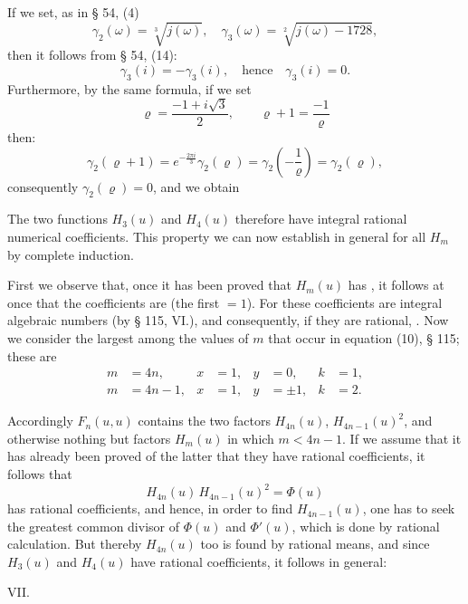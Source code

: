 If we set, as in § 54, (4)
\[
\gamma_2(\omega) = \sqrt[3]{j(\omega)}, \quad \gamma_3(\omega) = \sqrt[2]{j(\omega)-1728},
\]
then it follows from § 54, (14):
\[
\gamma_3(i) = -\gamma_3(i), \quad \text{hence} \quad \gamma_3(i) = 0.
\]
Furthermore, by the same formula, if we set
\[
\varrho = \frac{-1+i\sqrt{3}}{2}, \qquad \varrho+1 = \frac{-1}{\varrho}
\]
then:
\[
\gamma_2(\varrho+1) = e^{-\frac{2\pi i}{3}}\gamma_2(\varrho) = \gamma_2\left(-\frac{1}{\varrho}\right) = \gamma_2(\varrho),
\]
consequently $\gamma_2(\varrho) = 0$, and we obtain

The two functions $H_3(u)$ and $H_4(u)$ therefore have integral rational numerical coefficients. This property we can now establish in general for all $H_m$ by complete induction.

First we observe that, once it has been proved that $H_m(u)$ has , it follows at once that the coefficients are  (the first $=1$). For these coefficients are integral algebraic numbers (by § 115, VI.), and consequently, if they are rational, . Now we consider the largest among the values of $m$ that occur in equation (10), § 115; these are
\[
\begin{aligned}
m &= 4n, & x &= 1, & y &= 0, & k &= 1, \\
m &= 4n-1, & x &= 1, & y &= \pm 1, & k &= 2.
\end{aligned}
\]

Accordingly $F_n(u,u)$ contains the two factors $H_{4n}(u)$, $H_{4n-1}(u)^2$, and otherwise nothing but factors $H_m(u)$ in which $m<4n-1$. If we assume that it has already been proved of the latter that they have rational coefficients, it follows that
\[
H_{4n}(u)\, H_{4n-1}(u)^2 = \varPhi(u)
\]
has rational coefficients, and hence, in order to find $H_{4n-1}(u)$, one has to seek the greatest common divisor of $\varPhi(u)$ and $\varPhi'(u)$, which is done by rational calculation. But thereby $H_{4n}(u)$ too is found by rational means, and since $H_3(u)$ and $H_4(u)$ have rational coefficients, it follows in general:

VII. 
